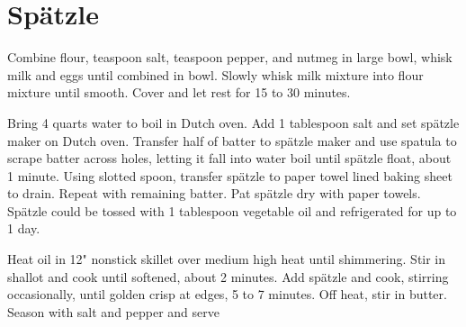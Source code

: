 \section{Sp\"{a}tzle}
\begin{recipe}



Combine flour,  teaspoon salt,  teaspoon pepper, and nutmeg in large bowl, whisk milk and eggs until combined in bowl. Slowly whisk milk mixture into flour mixture until smooth. Cover and let rest for 15 to 30 minutes.

Bring 4 quarts water to boil in Dutch oven. Add 1 tablespoon salt and set  sp\"{a}tzle maker on Dutch oven. Transfer half of batter to  sp\"{a}tzle maker and use spatula to scrape batter across holes, letting it fall into water boil until sp\"atzle float, about 1 minute. Using slotted spoon, transfer sp\"atzle to paper towel lined baking sheet to drain. Repeat with remaining batter. Pat sp\"atzle dry with paper towels. Sp\"atzle could be tossed with 1 tablespoon vegetable oil and refrigerated for up to 1 day.

Heat oil in 12" nonstick skillet over medium high heat until shimmering. Stir in shallot and cook until softened, about 2 minutes. Add sp\"atzle and cook, stirring occasionally, until golden crisp at edges, 5 to 7 minutes. Off heat, stir in butter. Season with salt and pepper and serve

\end{recipe}
